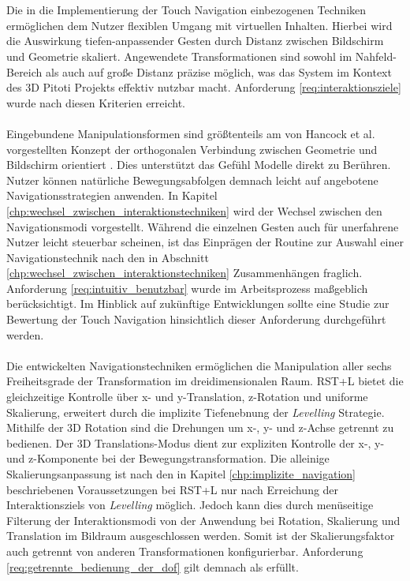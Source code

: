 \\\\
Die in die Implementierung der Touch Navigation einbezogenen Techniken ermöglichen dem Nutzer flexiblen Umgang mit virtuellen Inhalten. Hierbei wird die Auswirkung tiefen-anpassender Gesten durch Distanz zwischen Bildschirm und Geometrie skaliert. Angewendete Transformationen sind sowohl im Nahfeld-Bereich als auch auf große Distanz präzise möglich, was das System im Kontext des 3D Pitoti Projekts effektiv nutzbar macht. Anforderung \ref{req:interaktionsziele} wurde nach diesen Kriterien erreicht.
\\\\
Eingebundene Manipulationsformen sind größtenteils am von Hancock et al. vorgestellten Konzept der orthogonalen Verbindung zwischen Geometrie und Bildschirm orientiert \cite{hancock:2007,hancock:2009}. Dies unterstützt das Gefühl Modelle direkt zu Berühren. Nutzer können natürliche Bewegungsabfolgen demnach leicht auf angebotene Navigationsstrategien anwenden. In Kapitel \ref{chp:wechsel_zwischen_interaktionstechniken} wird der Wechsel zwischen den Navigationsmodi vorgestellt. Während die einzelnen Gesten auch für unerfahrene Nutzer leicht steuerbar scheinen, ist das Einprägen der Routine zur Auswahl einer Navigationstechnik nach den in Abschnitt \ref{chp:wechsel_zwischen_interaktionstechniken} Zusammenhängen fraglich. Anforderung \ref{req:intuitiv_benutzbar} wurde im Arbeitsprozess maßgeblich berücksichtigt. Im Hinblick auf zukünftige Entwicklungen sollte eine Studie zur Bewertung der Touch Navigation hinsichtlich dieser Anforderung durchgeführt werden. 
\\\\
Die entwickelten Navigationstechniken ermöglichen die Manipulation aller sechs Freiheitsgrade der Transformation im dreidimensionalen Raum. RST+L bietet die gleichzeitige Kontrolle über x- und y-Translation, z-Rotation und uniforme Skalierung, erweitert durch die implizite Tiefenebnung der \emph{Levelling} Strategie. Mithilfe der 3D Rotation sind die Drehungen um x-, y- und z-Achse getrennt zu bedienen. Der 3D Translations-Modus dient zur expliziten Kontrolle der x-, y- und z-Komponente bei der Bewegungstransformation. Die alleinige Skalierungsanpassung ist nach den in Kapitel \ref{chp:implizite_navigation} beschriebenen Voraussetzungen bei RST+L nur nach Erreichung der Interaktionsziels von \emph{Levelling} möglich. Jedoch kann dies durch menüseitige Filterung der Interaktionsmodi von der Anwendung bei Rotation, Skalierung und Translation im Bildraum ausgeschlossen werden. Somit ist der Skalierungsfaktor auch getrennt von anderen Transformationen konfigurierbar. Anforderung \ref{req:getrennte_bedienung_der_dof} gilt demnach als erfüllt.
